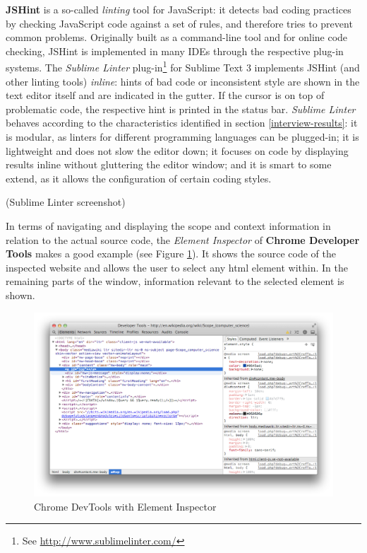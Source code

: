 \textbf{JSHint} is a so-called \emph{linting} tool for JavaScript: it
detects bad coding practices by checking JavaScript code against a set
of rules, and therefore tries to prevent common problems. Originally
built as a command-line tool and for online code checking, JSHint is
implemented in many IDEs through the respective plug-in systems. The
\emph{Sublime Linter} plug-in\footnote{See
  \url{http://www.sublimelinter.com/}} for Sublime Text 3 implements
JSHint (and other linting tools) \emph{inline}: hints of bad code or
inconsistent style are shown in the text editor itself and are indicated
in the gutter. If the cursor is on top of problematic code, the
respective hint is printed in the status bar. \emph{Sublime Linter}
behaves according to the characteristics identified in section
\ref{interview-results}: it is modular, as linters for different
programming languages can be plugged-in; it is lightweight and does not
slow the editor down; it focuses on code by displaying results inline
without gluttering the editor window; and it is smart to some extend, as
it allows the configuration of certain coding styles.

(Sublime Linter screenshot)

In terms of navigating and displaying the scope and context information
in relation to the actual source code, the \emph{Element Inspector} of
\textbf{Chrome Developer Tools} makes a good example (see Figure
\ref{fig:devtools}). It shows the source code of the inspected website
and allows the user to select any \ac{html} element within. In the
remaining parts of the window, information relevant to the selected
element is shown.

\begin{figure}[htbp]
\centering
\includegraphics[keepaspectratio,width=\textwidth,height=0.75\textheight]{img/devtools.png}
\caption{Chrome DevTools with Element Inspector}
\label{fig:devtools}
\end{figure}

